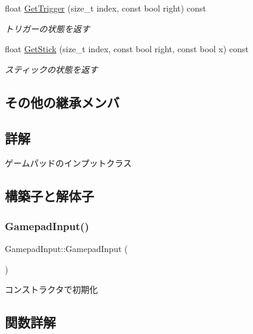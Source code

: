 \begin{DoxyCompactItemize}
float \mbox{\hyperlink{class_gamepad_input_a7e95e2a49cbd4729cf7156b9a703252a}{Get\+Trigger}} (size\+\_\+t index, const bool right) const
\begin{DoxyCompactList}\small\item\em トリガーの状態を返す \end{DoxyCompactList}\item 
float \mbox{\hyperlink{class_gamepad_input_a82333353a23ea0fa92bb87d6cf6592d8}{Get\+Stick}} (size\+\_\+t index, const bool right, const bool x) const
\begin{DoxyCompactList}\small\item\em スティックの状態を返す \end{DoxyCompactList}\end{DoxyCompactItemize}
\subsection*{その他の継承メンバ}


\subsection{詳解}
ゲームパッドのインプットクラス 

\subsection{構築子と解体子}
\mbox{\label{class_gamepad_input_acd9878326e438f379020827d63ebd6cf}} 
\subsubsection{\texorpdfstring{Gamepad\+Input()}{GamepadInput()}}
{\footnotesize\ttfamily Gamepad\+Input\+::\+Gamepad\+Input (\begin{DoxyParamCaption}{ }\end{DoxyParamCaption})}



コンストラクタで初期化 



\subsection{関数詳解}
\mbox{\label{class_gamepad_input_a9a2f9042a5fa1c8e33fbd349f67747b3}} 
